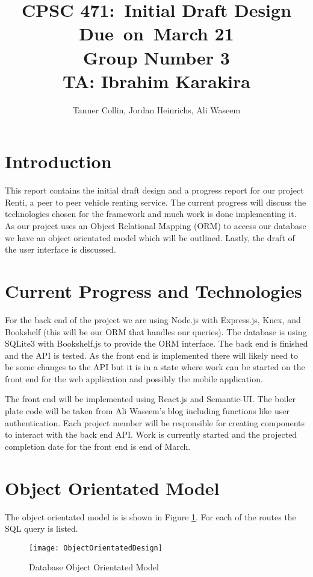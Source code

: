 \documentclass{article}
\title{
\vspace{2in}
\textmd{\textbf{CPSC 471:\ Initial Draft Design}}\\
\normalsize\vspace{0.1in}\small{Due\ on\ March 21 \\ Group Number 3 \\ TA: Ibrahim Karakira}\\
\vspace{3in}
}
\author{Tanner Collin, Jordan Heinrichs, Ali Waseem}
\date{}
\begin{document}
\maketitle
\newpage

\section{Introduction}
This report contains the initial draft design and a progress report for our project Renti, a peer to peer vehicle renting service. The current progress will discuss the
technologies chosen for the framework and much work is done implementing it. As our project uses an Object Relational Mapping (ORM) to access our database we have an
object orientated model which will be outlined. Lastly, the draft of the user interface is discussed. %

\section{Current Progress and Technologies}
For the back end of the project we are using Node.js with Express.js, Knex, and Bookshelf (this will be our ORM that handles our queries). The database is using SQLite3 with Bookshelf.js to provide the ORM interface.
The back end is finished and the API is tested. As the front end is implemented there will likely need to be some changes to the API but it is in a state where work can be started on the front end
for the web application and possibly the mobile application.

The front end will be implemented using React.js and Semantic-UI.
The boiler plate code will be taken from Ali Waseem's blog including functions like user authentication. %
Each project member will be responsible for creating components to interact with the back end API.
Work is currently started and the projected completion date for the front end is end of March.

\section{Object Orientated Model}
The object orientated model is is shown in Figure \ref{fig:oomodel}. For each of the
routes the SQL query is listed.
\begin{figure}[ht!]
    \texttt{[image: ObjectOrientatedDesign]}
    \caption{Database Object Orientated Model}
    \centering
    \label{fig:oomodel}
\end{figure}
\end{document}
